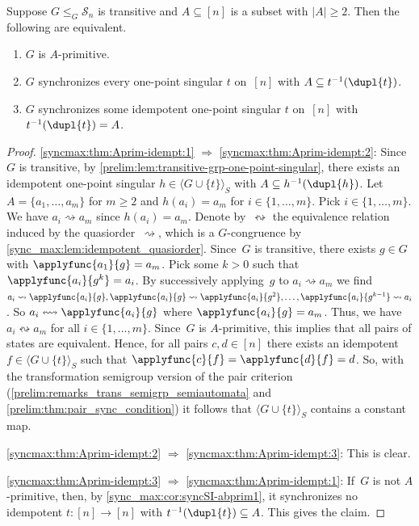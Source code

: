 \begin{theorem} \label{syncmax:thm:Aprim-idempt}
Suppose $G \le_G \mathcal S_n$ is transitive and $A \subseteq [n]$ is a subset with $|A| \ge 2$. Then the following are equivalent. 
\begin{enumerate}
\item \label{syncmax:thm:Aprim-idempt:1} $G$ is $A$-primitive.

\item \label{syncmax:thm:Aprim-idempt:2} $G$ synchronizes every one-point singular $t$ on~$[n]$
with $A \subseteq t^{-1}(\dupl{t})$. 

\item \label{syncmax:thm:Aprim-idempt:3} $G$ synchronizes some idempotent one-point singular $t$ on~$[n]$
with $t^{-1}(\dupl{t}) = A$.
\end{enumerate}
\end{theorem}
\begin{proof}
\ref{syncmax:thm:Aprim-idempt:1} $\Rightarrow$ \ref{syncmax:thm:Aprim-idempt:2}:
Since~$G$ is transitive, by \cref{prelim:lem:transitive-grp-one-point-singular}, there
exists an idempotent one-point singular $h \in \langle G \cup \{t\} \rangle_S$
with $A \subseteq h^{-1}(\dupl{h})$.
Let $A = \{a_1, \ldots, a_m\}$ for $m \ge 2$
and $h(a_i) = a_m$ for $i \in \{1,\ldots,m\}$.
Pick $i \in \{1,\ldots,m\}$.  We have $a_i \rightsquigarrow a_m$ since $h(a_i) = a_m$.
Denote by~$\leftrightsquigarrow$
the equivalence relation
induced by the quasiorder~$\rightsquigarrow$,
which is a $G$-congruence
by \cref{sync_max:lem:idempotent_quasiorder}.
Since~$G$ is transitive, there exists $g \in G$
with $\applyfunc{a_1}{g} = a_m$.
Pick some $k > 0$ 
such that $\applyfunc{a_i}{g^k} = a_i$.
By successively applying~$g$
to $a_i \rightsquigarrow a_m$
we find $a_i \rightsquigarrow \applyfunc{a_i}{g}, 
\applyfunc{a_i}{g} \rightsquigarrow \applyfunc{a_i}{g^2},
\ldots, 
\applyfunc{a_i}{g^{k-1}} \rightsquigarrow a_i$.
So $a_i \leftrightsquigarrow \applyfunc{a_i}{g}$ where $\applyfunc{a_i}{g} = a_m$.
Thus, we have $a_i \leftrightsquigarrow a_m$ for all $i \in \{1,\ldots,m\}$.
Since~$G$ is $A$-primitive,
this implies that all
pairs of states are equivalent.
Hence, for all pairs $c,d \in [n]$
there exists an idempotent $f \in \langle G \cup \{t\} \rangle_S$
such that $\applyfunc{c}{f} = \applyfunc{d}{f} = d$.
So, with the transformation semigroup version 
of the pair criterion (\cref{prelim:remarks_trans_semigrp_semiautomata} and \cref{prelim:thm:pair_sync_condition}) it follows
that $\langle G \cup \{t\} \rangle_S$
contains a constant map.	

\ref{syncmax:thm:Aprim-idempt:2} $\Rightarrow$ \ref{syncmax:thm:Aprim-idempt:3}: This is clear.

\ref{syncmax:thm:Aprim-idempt:3} $\Rightarrow$ \ref{syncmax:thm:Aprim-idempt:1}: 
 If~$G$ is not $A$-primitive, then, by \cref{sync_max:cor:syncSI-abprim1}, it synchronizes no
 idempotent $t \colon [n] \to [n]$ with $t^{-1}(\dupl{t}) \subseteq A$. This gives the claim.
\end{proof}

